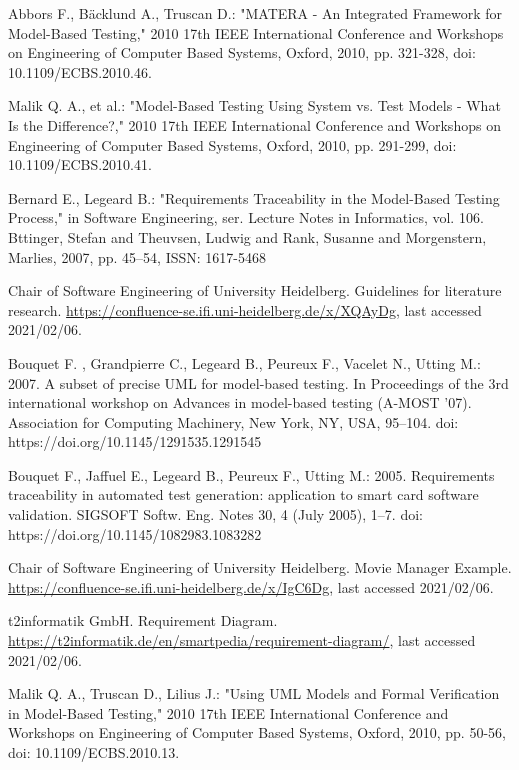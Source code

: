 \documentclass[a4paper,10pt, bibliography=totocnumbered]{scrreprt}
\begin{document}
\begin{thebibliography}{9}
 Abbors F., Bäcklund A., Truscan D.: "MATERA - An Integrated Framework for Model-Based Testing," 2010 17th IEEE International Conference and Workshops on Engineering of Computer Based Systems, Oxford, 2010, pp. 321-328, doi: 10.1109/ECBS.2010.46.

 Malik Q. A., et al.: "Model-Based Testing Using System vs. Test Models - What Is the Difference?," 2010 17th IEEE International Conference and Workshops on Engineering of Computer Based Systems, Oxford, 2010, pp. 291-299, doi: 10.1109/ECBS.2010.41.

 Bernard E., Legeard B.: "Requirements Traceability in the Model-Based Testing Process,"  in Software Engineering, ser. Lecture Notes in Informatics, vol. 106. Bttinger, Stefan and Theuvsen, Ludwig and Rank, Susanne and Morgenstern, Marlies, 2007, pp. 45–54, ISSN: 1617-5468

 Chair of Software Engineering of University Heidelberg. Guidelines for literature research.
\url{https://confluence-se.ifi.uni-heidelberg.de/x/XQAyDg}, last accessed 2021/02/06. 

 Bouquet F. , Grandpierre C., Legeard B., Peureux F., Vacelet N., Utting M.: 2007. A subset of precise UML for model-based testing. In Proceedings of the 3rd international workshop on Advances in model-based testing (A-MOST '07). Association for Computing Machinery, New York, NY, USA, 95–104. doi: https://doi.org/10.1145/1291535.1291545

 Bouquet F., Jaffuel E., Legeard B., Peureux F., Utting M.: 2005. Requirements traceability in automated test generation: application to smart card software validation. SIGSOFT Softw. Eng. Notes 30, 4 (July 2005), 1–7. doi: https://doi.org/10.1145/1082983.1083282

 Chair of Software Engineering of University Heidelberg. Movie Manager Example. 
\url{https://confluence-se.ifi.uni-heidelberg.de/x/IgC6Dg}, last accessed 2021/02/06. 

 t2informatik GmbH. Requirement Diagram.
\url{https://t2informatik.de/en/smartpedia/requirement-diagram/}, last accessed 2021/02/06. 

 Malik Q. A., Truscan D., Lilius J.: "Using UML Models and Formal Verification in Model-Based Testing," 2010 17th IEEE International Conference and Workshops on Engineering of Computer Based Systems, Oxford, 2010, pp. 50-56, doi: 10.1109/ECBS.2010.13.


\end{thebibliography}
\end{document}
